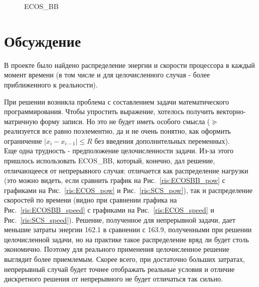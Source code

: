 \documentclass{article}
\begin{document}
\centering
\begin{figure}[h]
\caption{ECOS\_BB}
\end{figure}

\section{Обсуждение}

В проекте было найдено распределение энергии и скорости процессора в каждый момент времени (в том числе и для целочисленного случая - более приближенного к реальности).

При решении возникла проблема с составлением задачи математического программирования. Чтобы упростить выражение, хотелось получить векторно-матричную форму записи. Но это не будет иметь особого смысла ($\succeq$ реализуется все равно поэлементно, да и не очень понятно, как оформить ограничение $|x_i-x_{i-1}| \le R$ без введения дополнительных переменных). \\

Еще одна трудность - предположение целочисленности задачи. Из-за этого пришлось использовать ECOS\_BB, который, конечно, дал решение, отличающееся от непрерывного случая: отличается как распределение нагрузки (это можно видеть, если сравнить график на Рис.~\ref{ris:ECOSBB_pow} с графиками на Рис.~\ref{ris:ECOS_pow} и Рис.~\ref{ris:SCS_pow}), так и распределение скоростей по времени (видно при сравнении графика на Рис.~\ref{ris:ECOSBB_speed} с графиками на Рис.~\ref{ris:ECOS_speed} и Рис.~\ref{ris:SCS_speed}). Решение, полученное для непрерывной задачи, дает меньшие затраты энергии 162.1 в сравнении с 163.9, полученными при решении целочисленной задачи, но на практике такое распределение вряд ли будет столь экономично. Поэтому для реального применения целочисленное решение выглядит более приемлемым. Скорее всего, при достаточно больших затратах, непрерывный случай будет точнее отображать реальные условия и отличие дискретного решения от непрерывного не будет отличаться так сильно. \\
\end{document}
